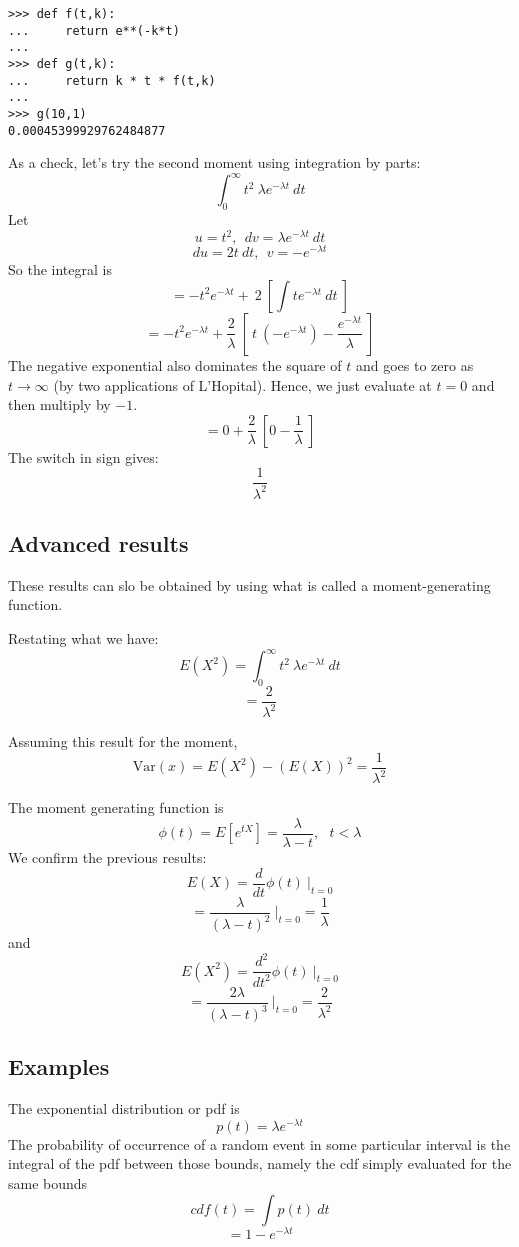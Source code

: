 \documentclass[11pt, oneside]{article}   	%
\begin{document}
\begin{verbatim}
>>> def f(t,k):
...     return e**(-k*t)
... 
>>> def g(t,k):
...     return k * t * f(t,k)
... 
>>> g(10,1)
0.00045399929762484877
\end{verbatim}

As a check, let's try the second moment using integration by parts:
\[ \int_0^{\infty} t^2 \ \lambda e^{-\lambda t} \ dt \]
Let
\[ u = t^2, \ \ dv = \lambda e^{-\lambda t} \ dt \]
\[ du = 2 t \ dt, \ \ v = -e^{-\lambda t} \]
So the integral is
\[ = -t^2 e^{-\lambda t} + \ 2 \ [ \int t e^{-\lambda t} \ dt \ ] \]
\[ = -t^2 e^{-\lambda t }+ \frac{2}{\lambda} \ [  \ t \ (-e^{-\lambda t}) - \frac{e^{-\lambda t}}{\lambda} \ ]  \]
The negative exponential also dominates the square of $t$ and goes to zero as $t \rightarrow \infty$ (by two applications of L'Hopital).  Hence, we just evaluate at $t=0$ and then multiply by $-1$.
\[ = 0 + \frac{2}{\lambda} \ [  0 - \frac{1}{\lambda} \ ]  \]
The switch in sign gives:
\[ \frac{1}{\lambda^2} \]

\subsection*{Advanced results}
These results can slo be obtained by using what is called a moment-generating function.

Restating what we have:
\[ E(X^2) =  \int_0^{\infty} t^2 \ \lambda e^{-\lambda t} \ dt \]
\[ = \frac{2}{\lambda^2} \]

Assuming this result for the moment,
\[ \text{Var}(x) = E(X^2) - (E(X))^2 = \frac{1}{\lambda^2} \]

The moment generating function is
\[ \phi(t) = E[e^{tX}] = \frac{\lambda}{\lambda - t}, \ \ \ t < \lambda \]
We confirm the previous results:
\[ E(X) = \frac{d}{dt} \phi(t) \ \bigg |_{t = 0} \]
\[ = \frac{\lambda}{(\lambda - t)^2} \ \bigg |_{t = 0} = \frac{1}{\lambda} \]
and
\[ E(X^2) = \frac{d^2}{dt^2} \phi(t) \ \bigg |_{t = 0} \]
\[ = \frac{2 \lambda}{(\lambda - t)^3} \ \bigg |_{t = 0} = \frac{2}{\lambda^2} \]

\subsection*{Examples}
The exponential distribution or pdf is
\[ p(t) = \lambda e^{-\lambda t} \]
The probability of occurrence of a random event in some particular interval is the integral of the pdf between those bounds, namely the cdf simply evaluated for the same bounds
\[ cdf(t) = \int p(t) \ dt \]
\[ = 1 - e^{-\lambda t} \]
\end{document}
